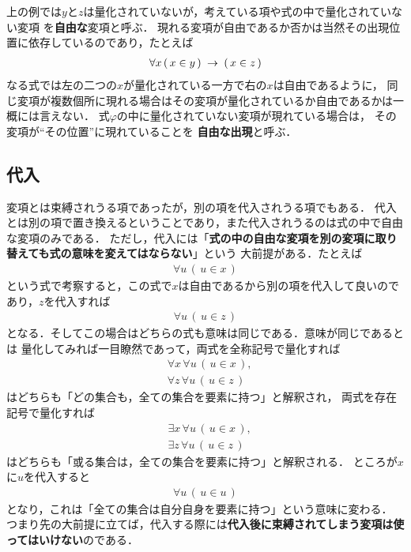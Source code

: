 	上の例では$y$と$z$は量化されていないが，考えている項や式の中で量化されていない変項
	を{\bf 自由な}変項と呼ぶ．
	現れる変項が自由であるか否かは当然その出現位置に依存しているのであり，たとえば
	\begin{align}
		\forall x\, (\, x \in y\, ) \hspace{0.25em}\rightarrow\hspace{0.25em} (\, x \in z\, )
	\end{align}
	なる式では左の二つの$x$が量化されている一方で右の$x$は自由であるように，
	同じ変項が複数個所に現れる場合はその変項が量化されているか自由であるかは一概には言えない．
	式$\varphi$の中に量化されていない変項が現れている場合は，
	その変項が``その位置''に現れていることを
	{\bf 自由な出現}と呼ぶ．
	
\subsection{代入}
	変項とは束縛されうる項であったが，別の項を代入されうる項でもある．
	代入とは別の項で置き換えるということであり，また代入されうるのは式の中で自由な変項のみである．
	ただし，代入には「{\bf 式の中の自由な変項を別の変項に取り替えても式の意味を変えてはならない}」という
	大前提がある．たとえば
	\begin{align}
		\forall u\, (\, u \in x\, )
	\end{align}
	という式で考察すると，この式で$x$は自由であるから別の項を代入して良いのであり，$z$を代入すれば
	\begin{align}
		\forall u\, (\, u \in z\, )
	\end{align}
	となる．そしてこの場合はどちらの式も意味は同じである．意味が同じであるとは
	量化してみれば一目瞭然であって，両式を全称記号で量化すれば
	\begin{align}
		&\forall x\, \forall u\, (\, u \in x\, ), \\
		&\forall z\, \forall u\, (\, u \in z\, )
	\end{align}
	はどちらも「どの集合も，全ての集合を要素に持つ」と解釈され，
	両式を存在記号で量化すれば
	\begin{align}
		&\exists x\, \forall u\, (\, u \in x\, ), \\
		&\exists z\, \forall u\, (\, u \in z\, )
	\end{align}
	はどちらも「或る集合は，全ての集合を要素に持つ」と解釈される．
	ところが$x$に$u$を代入すると
	\begin{align}
		\forall u\, (\, u \in u\, )
	\end{align}
	となり，これは「全ての集合は自分自身を要素に持つ」という意味に変わる．
	つまり先の大前提に立てば，代入する際には{\bf 代入後に束縛されてしまう変項は使ってはいけない}のである．
	
